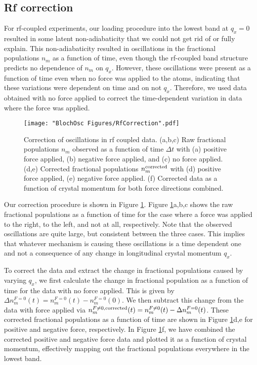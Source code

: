 \subsection{Rf correction} \label{sec:RfCorrection}
For rf-coupled experiments, our loading procedure into the lowest band at $q_x=0$ resulted in some latent non-adiabaticity that we could not get rid of or fully explain. This non-adiabaticity resulted in oscillations in the fractional populations $n_m$ as a function of time, even though the rf-coupled band structure predicts no dependence of $n_m$ on $q_x$. However, these oscillations were present as a function of time even when no force was applied to the atoms, indicating that these variations were dependent on time and on not $q_x$. Therefore, we used data obtained with no force applied to correct the time-dependent variation in data where the force was applied.
\begin{figure}
\texttt{[image: "BlochOsc Figures/RfCorrection".pdf]}
\caption[Correction of oscillations in rf coupled data]{Correction of oscillations in rf coupled data. (a,b,c) Raw fractional populations $n_m$ observed as a function of time $\Delta t$ with (a) positive force applied, (b) negative force applied, and (c) no force applied. (d,e) Corrected fractional populations $n_m^{\rm corrected}$ with (d) positive force applied, (e) negative force applied. (f) Corrected data as a function of crystal momentum for both force directions combined.  }
\label{fig:RfCorrection}
\end{figure}

Our correction procedure is shown in Figure \ref{fig:RfCorrection}.  Figure \ref{fig:RfCorrection}a,b,c shows the raw fractional populations as a function of time for the case where a force was applied to the right, to the left, and not at all, respectively. Note that the observed oscillations are quite large, but consistent between the three cases. This implies that whatever mechanism is causing these oscillations is a time dependent one and not a consequence of any change in longitudinal crystal momentum $q_x$. 

To correct the data and extract the change in fractional populations caused by varying $q_x$, we first calculate the change in fractional population as a function of time for the data with no force applied. This is given by $\Delta n_m^{F=0}(t) = n_m^{F=0}(t) - n_m^{F=0}(0)$. We then subtract this change from the data with force applied via $n_m^{F\neq0,{\rm corrected}}(t)=n_m^{F\neq0}(t)-\Delta n_m^{F=0}(t)$. These corrected fractional populations as a function of time are shown in Figure \ref{fig:RfCorrection}d,e for positive and negative force, respectively. In Figure \ref{fig:RfCorrection}f, we have combined the corrected positive and negative force data and plotted it as a function of crystal momentum, effectively mapping out the fractional populations everywhere in the lowest band. 

